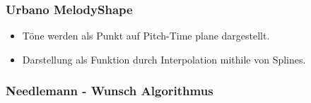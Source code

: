 \documentclass{beamer}
\begin{document}
	\begin{frame}
        \frametitle{Urbano MelodyShape}
        \begin{minipage}{0.45\textwidth}
            \begin{itemize}
             \item Töne werden als Punkt  auf Pitch-Time plane dargestellt.
             \item Darstellung als Funktion durch Interpolation mithile von Splines.
            \end{itemize}
        \end{minipage}
        \begin{minipage}{0.45\textwidth}
        \end{minipage}
	\end{frame}
	
    \begin{frame}
        \frametitle{Needlemann - Wunsch Algorithmus}
	\end{frame}
	
\end{document}
